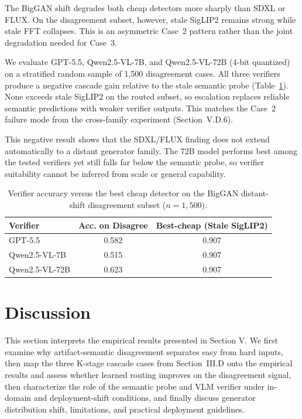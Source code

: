 \documentclass{ieeeaccess}
\begin{document}
The BigGAN shift degrades both cheap detectors more sharply than SDXL or FLUX. On the
disagreement subset, however, stale SigLIP2 remains strong while stale FFT collapses.
This is an asymmetric Case~2 pattern rather than the joint degradation needed for
Case~3.

We evaluate GPT-5.5, Qwen2.5-VL-7B, and Qwen2.5-VL-72B (4-bit quantized) on a
stratified random sample of 1{,}500 disagreement cases. All three verifiers produce a 
negative cascade gain relative to the stale semantic probe (Table~\ref{tab:biggan_shift}).
None exceeds stale SigLIP2 on the routed subset, so escalation replaces reliable
semantic predictions with weaker verifier outputs. This matches the Case~2 failure mode
from the cross-family experiment (Section~V.D.6).

This negative result shows that the SDXL/FLUX finding does not extend automatically to
a distant generator family. The 72B model performs best among the tested verifiers yet
still falls far below the semantic probe, so verifier suitability cannot be inferred
from scale or general capability.

\begin{table}[h]
\centering
\caption{Verifier accuracy versus the best cheap detector on the BigGAN distant-shift disagreement subset ($n{=}1{,}500$).}
\label{tab:biggan_shift}
\footnotesize
\setlength{\tabcolsep}{3pt}
\begin{tabular}{l c c}
\toprule
Verifier & Acc. on Disagree & Best-cheap (Stale SigLIP2) \\
\midrule
GPT-5.5 & 0.582 & 0.907 \\
Qwen2.5-VL-7B & 0.515 & 0.907 \\
Qwen2.5-VL-72B & 0.623 & 0.907 \\
\bottomrule
\end{tabular}
\end{table}


\section{Discussion}

This section interprets the empirical results presented in Section V. We first examine
why artifact-semantic disagreement separates easy from hard inputs, then map the
three K-stage cascade cases from Section~III.D onto the empirical results and assess whether
learned routing improves on the disagreement signal, then characterize the role of the
semantic probe and VLM verifier under in-domain and deployment-shift conditions, and
finally discuss generator distribution shift, limitations, and practical deployment
guidelines.
\end{document}
